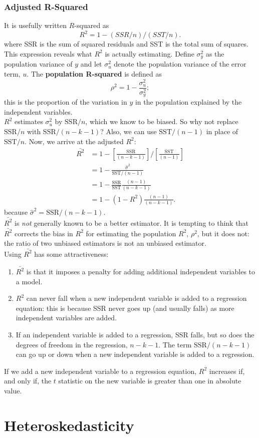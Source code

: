 \documentclass[a4paper, 10pt]{article}
\theoremstyle{definition}	%
\begin{document}
\subsubsection{Adjusted R-Squared}
It is usefully written $R$-squared as 
\begin{equation}
    R^2 = 1 - (SSR/n)/(SST/n). \label{eq:p.196,6.20}
\end{equation}
where SSR is the sum of squared residuals and SST is the total sum of squares. This expression reveals what $R^2$ is actually estimating. Define $\sigma_y^2$ as the population variance of $y$ and let $\sigma_u^2$ denote the population variance of the error term, $u$. The \textbf{population R-squared} is defined as
\begin{equation*}
    \rho^2 = 1 - \frac{\sigma_u^2}{\sigma_y^2};
\end{equation*}
this is the proportion of the variation in $y$ in the population explained by the independent variables.\\
$R^2$ estimates $\sigma_u^2$ by $\text{SSR}/n$, which we know to be biased. So why not replace $\text{SSR}/n$ with $\text{SSR}/(n - k - 1)$? Also, we can use $\text{SST}/(n - 1)$ in place of $\text{SST}/n$. Now, we arrive at the adjusted $R^2$:
\begin{align}
    \bar{R^2} &= 1 - \left[ \frac{\text{SSR}}{(n - k - 1)} \right] \Big/ \left[ \frac{\text{SST}}{(n - 1)} \right] \label{eq:p.196,6.21} \\
    &= 1 - \frac{\hat{\sigma}^2}{\text{SST}/(n - 1)} \\
    &= 1- \frac{\text{SSR}}{\text{SST}}\frac{(n-1)}{(n-k-1)}\\
    &= 1- (1-R^2)\frac{(n-1)}{(n-k-1)}.
\end{align}
because $\hat{\sigma}^2 = \text{SSR}/(n - k - 1)$.\\
$\bar{R^2}$ is \textit{not} generally known to be a better estimator. It is tempting to think that $\bar{R^2}$ corrects the bias in $R^2$ for estimating the population $R^2$, $\rho^2$, but it does not: the ratio of two unbiased estimators is not an unbiased estimator.\\
Using $\bar{R^2}$ has some attractiveness:
\begin{enumerate}
    \item $\bar{R^2}$ is that it imposes a penalty for adding additional independent variables to a model.
    \item $R^2$ can never fall when a new independent variable is added to a regression equation: this is because SSR never goes up (and usually falls) as more independent variables are added.
    \item If an independent variable is added to a regression, SSR falls, but so does the degrees of freedom in the regression, $n - k - 1$. The term $\text{SSR}/(n - k - 1)$ can go up or down when a new independent variable is added to a regression.
\end{enumerate}
If we add a new independent variable to a regression equation, $R^2$ increases if, and only if, the $t$ statistic on the new variable is greater than one in absolute value.



\newpage

\section{Heteroskedasticity}
\end{document}
